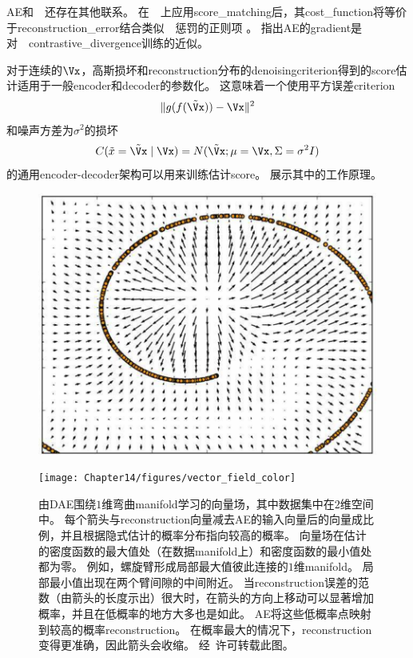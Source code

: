 \gls{AE}和~~还存在其他联系。
在~~上应用\gls{score_matching}后，其\gls{cost_function}将等价于\gls{reconstruction_error}结合类似~~惩罚的正则项 \citep{Swersky-ICML2011}。
\citet{Bengio+Delalleau-2009}指出\gls{AE}的\gls{gradient}是对~~\gls{contrastive_divergence}训练的近似。


对于连续的$\Vx$，高斯损坏和\gls{reconstruction}分布的\gls{denoising}\gls{criterion}得到的\gls{score}估计适用于一般\gls{encoder}和\gls{decoder}的参数化\citep{Alain+Bengio-ICLR2013-small}。
这意味着一个使用平方误差\gls{criterion}
\begin{align}
 \| g(f(\tilde \Vx)) - \Vx \|^2
\end{align}
和噪声方差为$\sigma^2 $的损坏
\begin{align}
 C(\tilde x = \tilde \Vx \mid \Vx) = N(\tilde \Vx; \mu=\Vx, \Sigma = \sigma^2 I)
\end{align}
的通用\gls{encoder}-\gls{decoder}架构可以用来训练估计\gls{score}。
展示其中的工作原理。

\begin{figure}[!htb]
\ifOpenSource
\centerline{\includegraphics[scale=0.5]{images/122.png}}
\else
\centerline{\texttt{[image: Chapter14/figures/vector\_field\_color]}}
\fi
\caption{由\gls{DAE}围绕$1$维弯曲\gls{manifold}学习的向量场，其中数据集中在$2$维空间中。
每个箭头与\gls{reconstruction}向量减去\gls{AE}的输入向量后的向量成比例，并且根据隐式估计的概率分布指向较高的概率。
向量场在估计的密度函数的最大值处（在数据\gls{manifold}上）和密度函数的最小值处都为零。
例如，螺旋臂形成局部最大值彼此连接的$1$维\gls{manifold}。
局部最小值出现在两个臂间隙的中间附近。
当\gls{reconstruction}误差的范数（由箭头的长度示出）很大时，在箭头的方向上移动可以显著增加概率，并且在低概率的地方大多也是如此。
\gls{AE}将这些低概率点映射到较高的概率\gls{reconstruction}。
在概率最大的情况下，\gls{reconstruction}变得更准确，因此箭头会收缩。
经~\citet{Alain+Bengio-ICLR2013-small}许可转载此图。
}
\label{fig:chap14_vector_field_color}
\end{figure}

